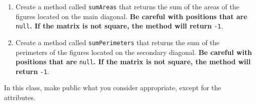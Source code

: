 \begin{enumerate}
    \item Create a method called \texttt{sumAreas} that returns the sum of the areas of the figures located on the main diagonal. \textbf{Be careful with positions that are} \texttt{null}\textbf{. If the matrix is not square, the method will return} \texttt{-1}.

    \item Create a method called \texttt{sumPerimeters} that returns the sum of the perimeters of the figures located on the secondary diagonal. \textbf{Be careful with positions that are} \texttt{null}\textbf{. If the matrix is not square, the method will return} \texttt{-1}.

\end{enumerate}

In this class, make public what you consider appropriate, except for the attributes.
